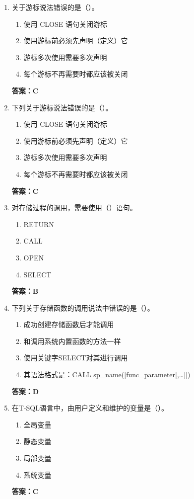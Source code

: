 \documentclass[12pt, a4paper]{article}
\begin{document}
\begin{enumerate}[label=\arabic*.]
	\item 关于游标说法错误的是（\quad）。
	      \begin{enumerate}
		      \item 使用 CLOSE 语句关闭游标
		      \item 使用游标前必须先声明（定义）它
		      \item 游标多次使用需要多次声明
		      \item 每个游标不再需要时都应该被关闭
	      \end{enumerate}
	      \textbf{答案：C}

	\item 下列关于游标说法错误的是（\quad）。
	      \begin{enumerate}
		      \item 使用 CLOSE 语句关闭游标
		      \item 使用游标前必须先声明（定义）它
		      \item 游标多次使用需要多次声明
		      \item 每个游标不再需要时都应该被关闭
	      \end{enumerate}
	      \textbf{答案：C}

	\item 对存储过程的调用，需要使用（\quad）语句。
	      \begin{enumerate}
		      \item RETURN
		      \item CALL
		      \item OPEN
		      \item SELECT
	      \end{enumerate}
	      \textbf{答案：B}

	\item 下列关于存储函数的调用说法中错误的是（\quad）。
	      \begin{enumerate}
		      \item 成功创建存储函数后才能调用
		      \item 和调用系统内置函数的方法一样
		      \item 使用关键字SELECT对其进行调用
		      \item 其语法格式是：CALL sp\_name([func\_parameter[,\dots]])
	      \end{enumerate}
	      \textbf{答案：D}

	\item 在T-SQL语言中，由用户定义和维护的变量是（\quad）。
	      \begin{enumerate}
		      \item 全局变量
		      \item 静态变量
		      \item 局部变量
		      \item 系统变量
	      \end{enumerate}
	      \textbf{答案：C}


\end{enumerate}
\end{document}
